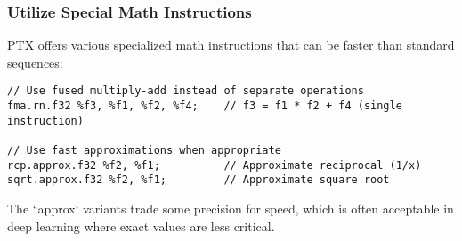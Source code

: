 \subsubsection{Utilize Special Math Instructions}

PTX offers various specialized math instructions that can be faster than standard sequences:

\begin{lstlisting}[style=ptx]
// Use fused multiply-add instead of separate operations
fma.rn.f32 %f3, %f1, %f2, %f4;    // f3 = f1 * f2 + f4 (single instruction)

// Use fast approximations when appropriate
rcp.approx.f32 %f2, %f1;          // Approximate reciprocal (1/x)
sqrt.approx.f32 %f2, %f1;         // Approximate square root
\end{lstlisting}

The `.approx` variants trade some precision for speed, which is often acceptable in deep learning where exact values are less critical.

